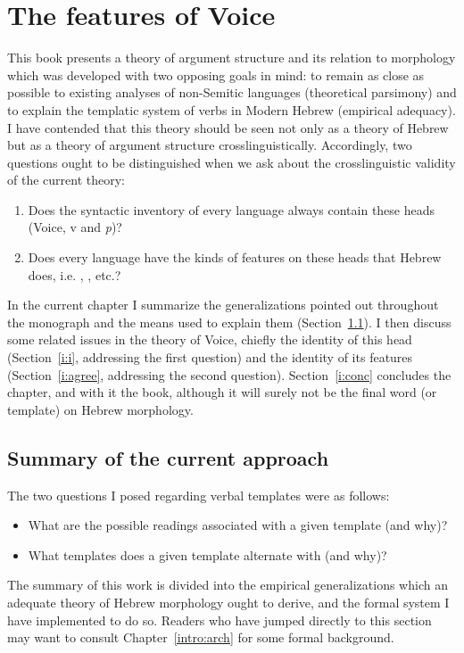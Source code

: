 \chapter{The features of Voice}
\label{chap:i}

This book presents a theory of argument structure and its relation to morphology which was developed with two opposing goals in mind: to remain as close as possible to existing analyses of non-Semitic languages (theoretical parsimony) and to explain the templatic system of verbs in Modern Hebrew (empirical adequacy). I have contended that this theory should be seen not only as a theory of Hebrew but as a theory of argument structure crosslinguistically. Accordingly, two questions ought to be distinguished when we ask about the crosslinguistic validity of the current theory:
\begin{enumerate}
	\item Does the syntactic inventory of every language always contain these heads (Voice, v and \emph{p})?
	\item Does every language have the kinds of features on these heads that Hebrew does, i.e. {\vd}, \pz, etc.?
\end{enumerate}

In the current chapter I summarize the generalizations pointed out throughout the monograph and the means used to explain them (Section~\ref{i:sum}). I then discuss some related issues in the theory of Voice, chiefly the identity of this head (Section~\ref{i:i}, addressing the first question) and the identity of its features (Section~\ref{i:agree}, addressing the second question). Section~\ref{i:conc} concludes the chapter, and with it the book, although it will surely not be the final word (or template) on Hebrew morphology.


\section{Summary of the current approach} \label{i:sum}
The two questions I posed regarding verbal templates were as follows:
\begin{itemize}
	\item What are the possible readings associated with a given template (and why)?
	\item What templates does a given template alternate with (and why)?
\end{itemize}

The summary of this work is divided into the empirical generalizations which an adequate theory of Hebrew morphology ought to derive, and the formal system I have implemented to do so. Readers who have jumped directly to this section may want to consult Chapter~\ref{intro:arch} for some formal background.

